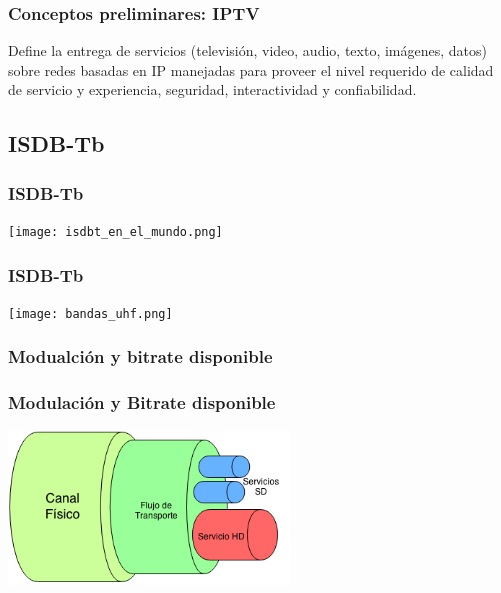 \documentclass[a4paper,11pt]{beamer}
\begin{document}
		\begin{frame}
			\frametitle{Conceptos preliminares: IPTV}
			\begin{definition}
				Define la entrega de servicios (televisión, video, audio, texto, imágenes, datos) sobre redes basadas en IP manejadas para proveer el nivel requerido de calidad de servicio y experiencia, seguridad, interactividad y confiabilidad.
			\end{definition}

		\end{frame}


	\subsection{ISDB-Tb}
		\begin{frame}
			\frametitle{ISDB-Tb}
			\begin{center}
				\texttt{[image: isdbt\_en\_el\_mundo.png]}
			\end{center}
		\end{frame}

		\begin{frame}
			\frametitle{ISDB-Tb}
			\begin{center}
				\texttt{[image: bandas\_uhf.png]}
			\end{center}
		\end{frame}

		\subsubsection{Modualción y bitrate disponible}
		\begin{frame}
			\frametitle{Modulación y Bitrate disponible}
			\begin{center}
				\includegraphics[width=7.5cm]{canal_fisico.png}
			\end{center}			
		\end{frame}
\end{document}
